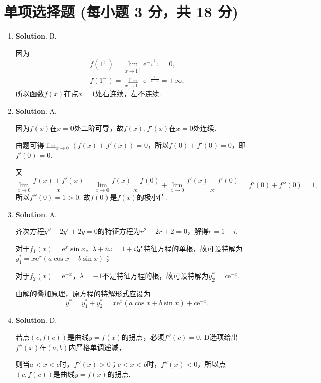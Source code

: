 \documentclass[../main.tex]{subfiles}
\begin{document}
\section{单项选择题 (每小题 3 分，共 18 分)}
\begin{enumerate}
    \item \textbf{Solution}. B.

          因为
          \[
              \begin{gathered}
                  f(1^{+})=\lim_{x\to1^+}\mathrm{e}^{-\frac{1}{x-1}}=0,\\
                  f(1^{-})=\lim_{x\to1^-}\mathrm{e}^{-\frac{1}{x-1}}=+\infty,
              \end{gathered}
          \]
          所以函数$f(x)$在点$x=1$处右连续，左不连续.

    \item \textbf{Solution}. A.

          因为$f(x)$在$x=0$处二阶可导，故$f(x),f'(x)$在$x=0$处连续.

          由题可得$\lim_{x\to0}(f(x)+f'(x))=0$，所以$f(0)+f'(0)=0$，即$f'(0)=0$.

          又
          \[
              \lim_{x\to0}\frac{f(x)+f'(x)}{x}=\lim_{x\to0}\frac{f(x)-f(0)}{x}+\lim_{x\to0}
              \frac{f'(x)-f'(0)}{x}=f'(0)+f''(0)=1,
          \]
          所以$f''(0)=1>0$. 故$f(0)$是$f(x)$的极小值.

    \item \textbf{Solution}. A.

          齐次方程$y''-2y'+2y=0$的特征方程为$r^{2}-2r+2=0$，解得$r=1\pm i$.

          对于$f_{1}(x)=\mathrm{e}^{x}\sin x$，$\lambda+i\omega = 1+i$是特征方程的单根，故可设特解为$y
                  _{1}^{*}=x\mathrm{e}^{x}(a\cos x+b\sin x)$；

          对于$f_{2}(x)=\mathrm{e}^{-x}$，$\lambda = -1$不是特征方程的根，故可设特解为$y
                  _{2}^{*}=c\mathrm{e}^{-x}$.

          由解的叠加原理，原方程的特解形式应设为
          \[
              y^{*}=y_{1}^{*}+y_{2}^{*}=x\mathrm{e}^{x}
              (a\cos x+b\sin x)+c\mathrm{e}^{-x}.
          \]

    \item \textbf{Solution}. D.

          若点$(c,f(c))$是曲线$y=f(x)$的拐点，必须$f''(c)=0$. D选项给出$f''(x)$在$(a,
              b)$内严格单调递减，

          则当$a<x<c$时，$f''(x)>0$；$c<x<b$时，$f''(x)<0$，所以点$(c,f(c))$是曲线$y=
              f(x)$的拐点.


\end{enumerate}
\end{document}
